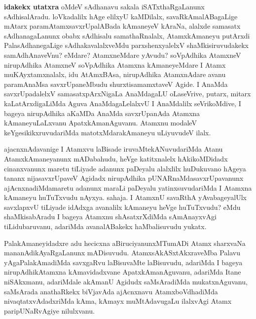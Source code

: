 \begin{artha}
\textbf{idakekx utatxra} oMdeV sAdhanavu sakala iSATxthaRgaLanunx sAdhisalAradu. loVkadalilx hAge elilxyU kaMDilalx, savaRkAmalABagaLige mAtarx paramAtamxsavxrUpalABada kAmaneyeV kAraNa, alalxde samasatx sAdhanagaLanunx obabx sAdhisalu samathaRnalalx, AtamxkAmaneyu putArxdi PalasAdhanegaLige sAdhakavalalxveMdu parxshenxyalelxV shaMkisiruvudakekx samAdhAnaveVnu? eMdare? AtamxneMdare yAvudu? soVpAdhika AtamxneV nirupAdhika AtamxneV soVpAdhika Atamxna kAmaneyeMdare I Atamx muKAyxtamxnalalx, idu AtAmxBAsa, nirupAdhika AtamxnAdare avanu paramAnaMsa savxrUpaneMbudu shurxtisamamxtaveV Agide. I AnaMda savxrUpadalelxV samasatxpArxNigaLa AnaMdagaLU oLaseVrive, putarx, mitarx kaLatArxdigaLiMda Aguva AnaMdagaLelalxvU I AnaMdalilx seVrikoMdive, I bageya nirupAdhika aKaMDa AnaMda savxrUpanAda Atamxna kAmaneyuLaLxvanu ApatxkAmanAguvanu. Atamxnu modaleV keYgesikikxruvudariMda matotxMdarakAmaneyu uLiyuvudeV ilalx.
\end{artha}



\begin{artha}
ajacnxnAdavanige I Atamxvu laBisade iruvaMtekANuvudariMda Atanu AtamxkAmaneyanunx mADabahudu, heVge katitxnalelx hAkikoMDidadx cinanxvanunx maretu tiLiyade adanunx paDeyalu alalxlilx huDukuvano hAgeya tananx nijasavxrUpaveV Agidadx nirupAdhika pUNARnaMdasavxrUpavanunx ajAcnxnadiMdamaretu adanunx maraLi paDeyalu yatinxsuvudariMda I Atamxna kAmaneyu huTuTxvudu nAyxya. sahaja. I AtamxnU savaRthA yAvabageyalUlx savxlapxvU tiLiyade idAdxga avanalilx kAmaneyu heVge huTuTxvudu? eMdu shaMkisabAradu I bageya Atamxnu shAsatxrXdiMda sAmAnayxvAgi tiLidubaruvanu, adariMda avanalABakekx haMbalisuvudu yukatx. 

PalakAmaneyidadxre adu hecicxna aBiruciyanunxMTumADi Atamx sharxvaNa mananAdikAyaRgaLanunx mADisuvudu. AtamxsAkASxtAkxraveMba Palavu yAgaPalakAmadiMda savxgaRvu laBisuvaMte laBisuvudu, adariMda I bageya nirupAdhikAtamxna kAmavidadxvane ApatxkAmanAguvanu, adariMda Itane niSAkxmanu, adariMdale akAmanU Agidudx saMsAradiMda mukatxnAguvanu, saMsArada anathaRkekx biVjavAda ajAcnxnavu AtamxboVdhadiMda nivaqtatxvAdadxriMda kAma, kAmayx muMtAdavugaLu ilalxvAgi Atamx paripUNaRvAgiye nilulxvanu.
\end{artha}

